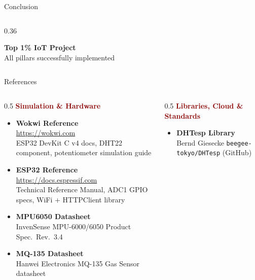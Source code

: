 \documentclass[aspectratio=169, 10pt]{beamer}
\begin{document}
\begin{frame}[shrink=5]{Conclusion}
\begin{columns}[T]
\begin{column}{0.36\textwidth}
\begin{center}
      \textbf{\textcolor{nithgold}{\small Top 1\% IoT Project}}\\[2pt]
      \textcolor{codegray}{\tiny All pillars successfully implemented}
      \end{center}
    \end{column}
  \end{columns}
\end{frame}

\begin{frame}[shrink=3]{References}
  \begin{columns}[T]
    \begin{column}{0.5\textwidth}
      \textbf{\textcolor{darkred}{Simulation \& Hardware}}
      \begin{itemize}\setlength\itemsep{0.35em}
        \item \textbf{Wokwi Reference}\\
          {\footnotesize \url{https://wokwi.com}\\
          ESP32 DevKit C v4 docs, DHT22 component, potentiometer simulation guide}

        \item \textbf{ESP32 Reference}\\
          {\footnotesize \url{https://docs.espressif.com}\\
          Technical Reference Manual, ADC1 GPIO specs, WiFi + HTTPClient library}

        \item \textbf{MPU6050 Datasheet}\\
          {\footnotesize InvenSense MPU-6000/6050 Product Spec.\ Rev.\ 3.4}

        \item \textbf{MQ-135 Datasheet}\\
          {\footnotesize Hanwei Electronics MQ-135 Gas Sensor datasheet}
      \end{itemize}
    \end{column}
    \begin{column}{0.5\textwidth}
      \textbf{\textcolor{darkred}{Libraries, Cloud \& Standards}}
      \begin{itemize}\setlength\itemsep{0.35em}
        \item \textbf{DHTesp Library}\\
          {\footnotesize Bernd Giesecke \texttt{beegee-tokyo/DHTesp} (GitHub)}


\end{itemize}
\end{column}
\end{columns}
\end{frame}
\end{document}
